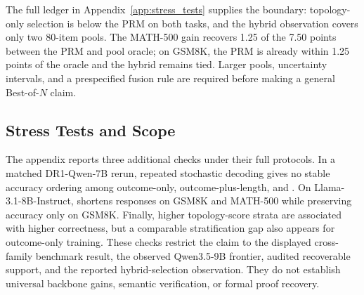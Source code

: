 The full ledger in Appendix~\ref{app:stress_tests} supplies the boundary: topology-only selection is below the PRM on both tasks, and the hybrid observation covers only two 80-item pools. The MATH-500 gain recovers 1.25 of the 7.50 points between the PRM and pool oracle; on GSM8K, the PRM is already within 1.25 points of the oracle and the hybrid remains tied. Larger pools, uncertainty intervals, and a prespecified fusion rule are required before making a general Best-of-$N$ claim.
    
\subsection{Stress Tests and Scope}

The appendix reports three additional checks under their full protocols. In a matched DR1-Qwen-7B rerun, repeated stochastic decoding gives no stable accuracy ordering among outcome-only, outcome-plus-length, and \method. On Llama-3.1-8B-Instruct, \method shortens responses on GSM8K and MATH-500 while preserving accuracy only on GSM8K. Finally, higher topology-score strata are associated with higher correctness, but a comparable stratification gap also appears for outcome-only training. These checks restrict the claim to the displayed cross-family benchmark result, the observed Qwen3.5-9B frontier, audited recoverable support, and the reported hybrid-selection observation. They do not establish universal backbone gains, semantic verification, or formal proof recovery.
